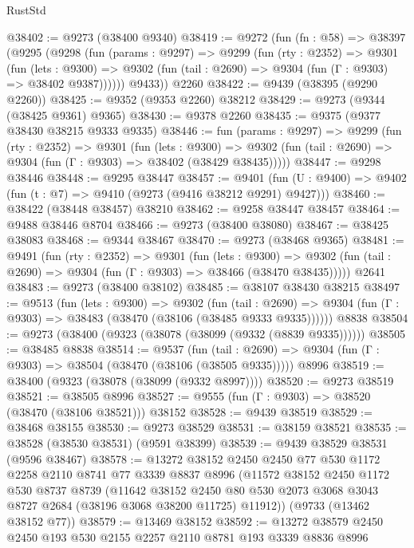 \begin{lexlean}{RustStd}
\begin{coremodule}
{\begin{coremodule}
{{{{{{{{{{{{{{{{{{{{{{{{{{{{{{{{{{{{{{{{{{{{{{{{{{{{{{{@38402 := @9273 (@38400 @9340)
@38419 := @9272
    (fun (fn : @58) =>
    @38397
      (@9295
        (@9298
          (fun (params : @9297) =>
          @9299
            (fun (rty : @2352) =>
            @9301
              (fun (lets : @9300) =>
              @9302 (fun (tail : @2690) => @9304 (fun (Γ : @9303) => @38402 @9387))))))
        @9433))
    @2260
@38422 := @9439 (@38395 (@9290 @2260))
@38425 := @9352 (@9353 @2260) @38212
@38429 := @9273 (@9344 (@38425 @9361) @9365)
@38430 := @9378 @2260
@38435 := @9375 (@9377 @38430 @38215 @9333 @9335)
@38446 := fun (params : @9297) =>
  @9299
    (fun (rty : @2352) =>
    @9301
      (fun (lets : @9300) =>
      @9302 (fun (tail : @2690) => @9304 (fun (Γ : @9303) => @38402 (@38429 @38435)))))
@38447 := @9298 @38446
@38448 := @9295 @38447
@38457 := @9401
    (fun (U : @9400) => @9402 (fun (t : @7) => @9410 (@9273 (@9416 @38212 @9291) @9427)))
@38460 := @38422 (@38448 @38457) @38210
@38462 := @9258 @38447 @38457
@38464 := @9488 @38446 @8704
@38466 := @9273 (@38400 @38080)
@38467 := @38425 @38083
@38468 := @9344 @38467
@38470 := @9273 (@38468 @9365)
@38481 := @9491
    (fun (rty : @2352) =>
    @9301
      (fun (lets : @9300) =>
      @9302 (fun (tail : @2690) => @9304 (fun (Γ : @9303) => @38466 (@38470 @38435)))))
    @2641
@38483 := @9273 (@38400 @38102)
@38485 := @38107 @38430 @38215
@38497 := @9513
    (fun (lets : @9300) =>
    @9302
      (fun (tail : @2690) =>
      @9304 (fun (Γ : @9303) => @38483 (@38470 (@38106 (@38485 @9333 @9335))))))
    @8838
@38504 := @9273 (@38400 (@9323 (@38078 (@38099 (@9332 (@8839 @9335))))))
@38505 := @38485 @8838
@38514 := @9537
    (fun (tail : @2690) => @9304 (fun (Γ : @9303) => @38504 (@38470 (@38106 (@38505 @9335)))))
    @8996
@38519 := @38400 (@9323 (@38078 (@38099 (@9332 @8997))))
@38520 := @9273 @38519
@38521 := @38505 @8996
@38527 := @9555 (fun (Γ : @9303) => @38520 (@38470 (@38106 @38521))) @38152
@38528 := @9439 @38519
@38529 := @38468 @38155
@38530 := @9273 @38529
@38531 := @38159 @38521
@38535 := @38528 (@38530 @38531) (@9591 @38399)
@38539 := @9439 @38529 @38531 (@9596 @38467)
@38578 := @13272
    @38152
    @2450
    @2450
    @77
    @530
    @1172
    @2258
    @2110
    @8741
    @77
    @3339
    @8837
    @8996
    (@11572
      @38152
      @2450
      @1172
      @530
      @8737
      @8739
      (@11642
        @38152
        @2450
        @80
        @530
        @2073
        @3068
        @3043
        @8727
        @2684
        (@38196 @3068 @38200 @11725)
        @11912))
    (@9733 (@13462 @38152 @77))
@38579 := @13469 @38152
@38592 := @13272 @38579 @2450 @2450 @193 @530 @2155 @2257 @2110 @8781 @193 @3339 @8836 @8996
}}}}}}}}}}}}}}}}}}}}}}}}}}}}}}}}}}}}}}}}}}}}}}}}}}}}}}}
\end{coremodule}}
\end{coremodule}
\end{lexlean}
